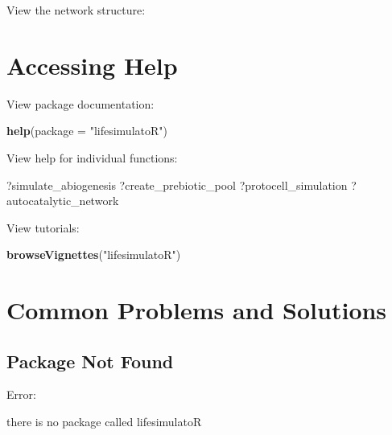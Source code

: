 \documentclass[
  oneside,
  openany]{book}
\newenvironment{Shaded}{\begin{snugshade}}{\end{snugshade}}
\newcommand{\AttributeTok}[1]{\textcolor[rgb]{0.13,0.29,0.53}{#1}}
\newcommand{\FunctionTok}[1]{\textcolor[rgb]{0.13,0.29,0.53}{\textbf{#1}}}
\newcommand{\NormalTok}[1]{#1}
\newcommand{\SpecialCharTok}[1]{\textcolor[rgb]{0.81,0.36,0.00}{\textbf{#1}}}
\newcommand{\StringTok}[1]{\textcolor[rgb]{0.31,0.60,0.02}{#1}}
\begin{document}
View the network structure:

\begin{Shaded}
\end{Shaded}

\section{Accessing Help}\label{accessing-help}

View package documentation:

\begin{Shaded}
\begin{Highlighting}[]
\FunctionTok{help}\NormalTok{(}\AttributeTok{package =} \StringTok{"lifesimulatoR"}\NormalTok{)}
\end{Highlighting}
\end{Shaded}

View help for individual functions:

\begin{Shaded}
\begin{Highlighting}[]
\NormalTok{?simulate\_abiogenesis}
\NormalTok{?create\_prebiotic\_pool}
\NormalTok{?protocell\_simulation}
\NormalTok{?autocatalytic\_network}
\end{Highlighting}
\end{Shaded}

View tutorials:

\begin{Shaded}
\begin{Highlighting}[]
\FunctionTok{browseVignettes}\NormalTok{(}\StringTok{"lifesimulatoR"}\NormalTok{)}
\end{Highlighting}
\end{Shaded}

\section{Common Problems and Solutions}\label{common-problems-and-solutions}

\subsection{Package Not Found}\label{package-not-found}

Error:

\begin{Shaded}
\begin{Highlighting}[]
\NormalTok{there is no package called }\StringTok{\textquotesingle{}lifesimulatoR\textquotesingle{}}
\end{Highlighting}
\end{Shaded}
\end{document}
